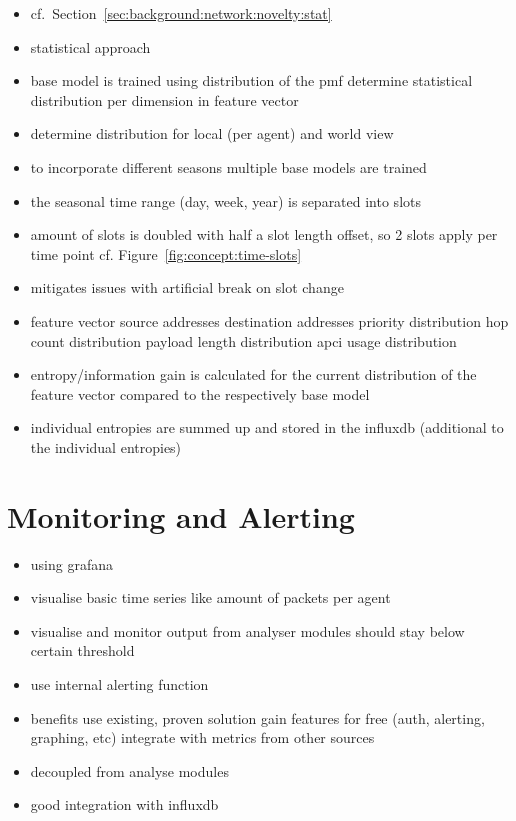 \begin{itemize}
	\item cf.~Section~\ref{sec:background:network:novelty:stat}
	\item statistical approach
	\item base model is trained using distribution of the \gls{pmf}
		\subitem determine statistical distribution per dimension in feature vector
	\item determine distribution for local (per agent) and world view
	\item to incorporate different seasons multiple base models are trained 
	\item the seasonal time range (day, week, year) is separated into slots
	\item amount of slots is doubled with half a slot length offset, so 2 slots apply per time point cf. Figure~\ref{fig:concept:time-slots}
	\item mitigates issues with artificial break on slot change
	\item feature vector
		\subitem source addresses
		\subitem destination addresses
		\subitem priority distribution
		\subitem hop count distribution
		\subitem payload length distribution
		\subitem \gls{apci} usage distribution
	\item entropy/information gain is calculated for the current distribution of the feature vector compared to the respectively base model
	\item individual entropies are summed up and stored in the \gls{influxdb} (additional to the individual entropies)
\end{itemize}

\section{Monitoring and Alerting}
\label{sec:concept:mon}

\begin{itemize}
	\item using \gls{grafana}
	\item visualise basic time series like amount of packets per agent
	\item visualise and monitor output from analyser modules
		\subitem should stay below certain threshold
	\item use internal alerting function
	\item benefits
		\subitem use existing, proven solution
		\subitem gain features for free (auth, alerting, graphing, etc)
		\subitem integrate with metrics from other sources
	\item decoupled from analyse modules
	\item good integration with \gls{influxdb}
\end{itemize}
